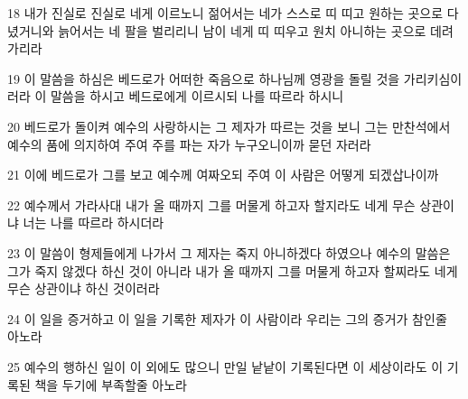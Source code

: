 \par 18 내가 진실로 진실로 네게 이르노니 젊어서는 네가 스스로 띠 띠고 원하는 곳으로 다녔거니와 늙어서는 네 팔을 벌리리니 남이 네게 띠 띠우고 원치 아니하는 곳으로 데려가리라
\par 19 이 말씀을 하심은 베드로가 어떠한 죽음으로 하나님께 영광을 돌릴 것을 가리키심이러라 이 말씀을 하시고 베드로에게 이르시되 나를 따르라 하시니
\par 20 베드로가 돌이켜 예수의 사랑하시는 그 제자가 따르는 것을 보니 그는 만찬석에서 예수의 품에 의지하여 주여 주를 파는 자가 누구오니이까 묻던 자러라
\par 21 이에 베드로가 그를 보고 예수께 여짜오되 주여 이 사람은 어떻게 되겠삽나이까
\par 22 예수께서 가라사대 내가 올 때까지 그를 머물게 하고자 할지라도 네게 무슨 상관이냐 너는 나를 따르라 하시더라
\par 23 이 말씀이 형제들에게 나가서 그 제자는 죽지 아니하겠다 하였으나 예수의 말씀은 그가 죽지 않겠다 하신 것이 아니라 내가 올 때까지 그를 머물게 하고자 할찌라도 네게 무슨 상관이냐 하신 것이러라
\par 24 이 일을 증거하고 이 일을 기록한 제자가 이 사람이라 우리는 그의 증거가 참인줄 아노라
\par 25 예수의 행하신 일이 이 외에도 많으니 만일 낱낱이 기록된다면 이 세상이라도 이 기록된 책을 두기에 부족할줄 아노라


